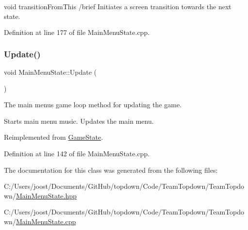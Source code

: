 void transition\+From\+This /brief Initiates a screen transition towards the next state. 

Definition at line 177 of file Main\+Menu\+State.\+cpp.

\mbox{\label{class_main_menu_state_a35ec35095919057ef7373906b09a9d30}} 
\subsubsection{\texorpdfstring{Update()}{Update()}}
{\footnotesize\ttfamily void Main\+Menu\+State\+::\+Update (\begin{DoxyParamCaption}{ }\end{DoxyParamCaption})\hspace{0.3cm}{\ttfamily [virtual]}}



The main menu\textquotesingle{}s game loop method for updating the game. 

Starts main menu music. Updates the main menu. 

Reimplemented from \hyperlink{class_game_state_a5be51b634f95bc6e57066ad6931aa18b}{Game\+State}.



Definition at line 142 of file Main\+Menu\+State.\+cpp.



The documentation for this class was generated from the following files\+:\begin{DoxyCompactItemize}
\item 
C\+:/\+Users/joost/\+Documents/\+Git\+Hub/topdown/\+Code/\+Team\+Topdown/\+Team\+Topdown/\hyperlink{_main_menu_state_8hpp}{Main\+Menu\+State.\+hpp}\item 
C\+:/\+Users/joost/\+Documents/\+Git\+Hub/topdown/\+Code/\+Team\+Topdown/\+Team\+Topdown/\hyperlink{_main_menu_state_8cpp}{Main\+Menu\+State.\+cpp}\end{DoxyCompactItemize}

